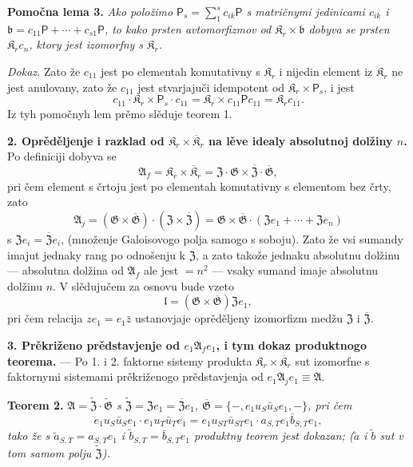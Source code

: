 \documentclass[11pt]{article}
\begin{document}
\noindent\textbf{Pomočna lema 3.} \emph{Ako položimo \(\mathsf{P}_s=\sum_1^s c_{ik}\mathsf{P}\) s matričnymi jedinicami \(c_{ik}\) i \(\mathfrak b=c_{11}\mathsf{P}+\cdots+c_{s1}\mathsf{P}\), to kako prsten avtomorfizmov od \(\mathfrak K_r\times\mathfrak b\) dobyva se prsten \(\mathfrak K_rc_n\), ktory jest izomorfny s \(\mathfrak K_r\).}

\noindent\emph{Dokaz.} Zato že \(c_{11}\) jest po elementah komutativny s \(\mathfrak K_r\) i nijedin element iz \(\mathfrak K_r\) ne jest anulovany, zato že \(c_{11}\) jest stvarjajuči idempotent od \(\mathfrak K_r\times \mathsf{P}_s\), i jest
\[
c_{11}\cdot\mathfrak K_r\times \mathsf{P}_s\cdot c_{11}
=\mathfrak K_r\times c_{11}\mathsf Pc_{11}
=\mathfrak K_rc_{11}.
\]
Iz tyh pomočnyh lem prěmo slěduje teorem 1.

\noindent\textbf{2. Oprěděljenje i razklad od \(\mathfrak K_r\times\overline{\mathfrak K}_r\) na lěve idealy absolutnoj dolžiny \(n\).} Po definiciji dobyva se
\[
\mathfrak A_f=\mathfrak K_r\times\overline{\mathfrak K}_r
=\mathfrak Z\cdot\mathfrak G\times\overline{\mathfrak Z}\cdot\overline{\mathfrak G},
\]
pri čem element s črtoju jest po elementah komutativny s elementom bez črty, zato
\[
\mathfrak A_j
=(\mathfrak G\times\overline{\mathfrak G})\cdot(\mathfrak Z\times\overline{\mathfrak Z})
=\mathfrak G\times\overline{\mathfrak G}\cdot(\mathfrak Ze_1+\cdots+\mathfrak Ze_n)
\]
s \(\mathfrak Ze_i=\overline{\mathfrak Z}e_i\), (množenje Galoisovogo polja samogo s soboju). Zato že vsi sumandy imajut jednaky rang po odnošenju k \(\mathfrak Z\), a zato takože jednaku absolutnu dolžinu --- absolutna dolžina od \(\mathfrak A_f\) ale jest \(=n^2\) --- vsaky sumand imaje absolutnu dolžinu \(n\). V slědujučem za osnovu bude vzeto
\[
\mathfrak l=(\mathfrak G\times\overline{\mathfrak G})\mathfrak Ze_1,
\]
pri čem relacija \(ze_1=e_1\bar z\) ustanovjaje oprěděljeny izomorfizm medžu \(\mathfrak Z\) i \(\overline{\mathfrak Z}\).

\noindent\textbf{3. Prěkriženo prědstavjenje od \(e_1\mathfrak A_fe_1\), i tym dokaz produktnogo teorema.} --- Po 1. i 2. faktorne sistemy produkta \(\mathfrak K_r\times\overline{\mathfrak K}_r\) sut izomorfne s faktornymi sistemami prěkriženogo prědstavjenja od \(e_1\mathfrak A_je_1\equiv\mathfrak A\).

\noindent\textbf{Teorem 2.} \emph{\(\mathfrak A=\widetilde{\mathfrak Z}\cdot\widetilde{\mathfrak G}\) s \(\widetilde{\mathfrak Z}=\mathfrak Ze_1=\overline{\mathfrak Z}e_1\), \(\overline{\mathfrak G}=\{-,e_1u_S\bar u_Se_1,-\}\), pri čem
\[
e_1u_S\bar u_Se_1\cdot e_1u_T\bar u_Te_1
=e_1u_{ST}\bar u_{ST}e_1\cdot a_{S,T}e_1\bar b_{S,T}e_1,
\]
tako že s \(\tilde a_{S,T}=a_{S,T}e_1\) i \(\tilde b_{S,T}=\bar b_{S,T}e_1\) produktny teorem jest dokazan; (\(\tilde a\) i \(\tilde b\) sut v tom samom polju \(\widetilde{\mathfrak Z}\)).}
\end{document}
